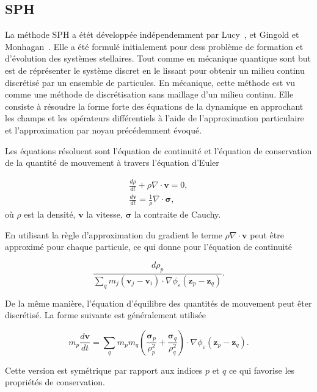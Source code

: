 \subsection{SPH}

La méthode SPH a étét développée indépendemment par Lucy~\cite{lucy_1977}, et Gingold et Monhagan~\cite{gingold_monaghan_sph_1977}. Elle a été formulé initialement pour dess problème de formation et d'évolution des systèmes stellaires. Tout comme en mécanique quantique sont but est de réprésenter le système discret en le lissant pour obtenir un milieu continu discrétisé par un ensemble de particules. En mécanique, cette méthode est vu comme une méthode de discrétisation sans maillage d'un milieu continu.
Elle consiste à résoudre la forme forte des équations de la dynamique en approchant les champs et les opérateurs différentiels à l'aide de l'approximation particulaire et l'approximation par noyau précédemment évoqué.

Les équations résoluent sont l'équation de continuité et l'équation de conservation de la quantité de mouvement à travers l'équation d'Euler

\begin{eqnarray*}
    \frac{d\rho}{dt} + \rho \nabla \cdot \bm{v} = 0, \\
    \frac{d\bm v}{dt} = \frac1\rho \nabla \cdot \bm \sigma,
\end{eqnarray*}où $\rho$ est la densité, $\bm v$ la vitesse, $\bm \sigma$ la contraite de Cauchy.

En utilisant la règle d'approximation du gradient le terme $\rho \nabla \cdot \bm{v}$ peut être approximé pour chaque particule, ce qui donne pour l'équation de continuité

\begin{equation*}
    \frac{d\rho_p}{\sum_{q} m_j (\bm v_j - \bm v_i) \cdot \nabla \phi_\varepsilon(\bm z_p - \bm z_q)}.
\end{equation*}

De la même manière, l'équation d'équilibre des quantités de mouvement peut êter discrétisé. La forme suivante est généralement utilisée

\begin{equation*}
    m_p \frac{d \bm v}{dt} = \sum_{q} m_p m_q \left(\frac{\bm \sigma_p}{\rho_p^2} + \frac{\bm \sigma_q}{\rho_q^2} \right) \cdot \nabla \phi_\varepsilon(\bm z_p - \bm z_q).
\end{equation*}

Cette version est symétrique par rapport aux indices $p$ et $q$ ce qui favorise les propriétés de conservation.

